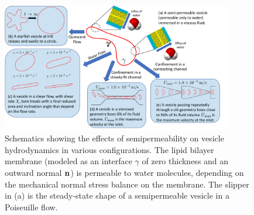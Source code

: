 \documentclass[prb,preprint,showpacs,preprintnumbers,amsmath,amssymb,longbibliography]{revtex4-1}
\begin{document}
%


%
\begin{figure}[htp]
  \centering
  \includegraphics[width=0.9\textwidth]{figures/schematic.pdf}
  \caption{\label{fig:sketch} Schematics showing the effects of
  semipermeability on vesicle hydrodynamics in various configurations. 
  The lipid bilayer membrane (modeled as an interface $\gamma$ of zero
  thickness and an outward normal $\mathbf{n}$) is permeable to water
  molecules, depending on the mechanical normal stress balance on the
  membrane.  The slipper in (a) is the steady-state shape of a
  semipermeable vesicle in a Poiseuille flow.}
\end{figure}
%
\end{document}
